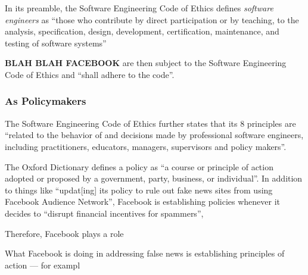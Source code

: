 \par In its preamble, the Software Engineering Code of Ethics defines \emph{software engineers} as ``those who contribute by direct participation or by teaching, to the analysis, specification, design, development, certification, maintenance, and testing of software systems'' 

\par \textbf{BLAH BLAH FACEBOOK} are then subject to the Software Engineering Code of Ethics and ``shall adhere to the code''. \cite{se_code}

\subsubsection{As Policymakers}

\par The Software Engineering Code of Ethics further states that its 8 principles are ``related to the behavior of and decisions made by professional software engineers, including practitioners, educators, managers, supervisors and policy makers''.
 
\par The Oxford Dictionary defines a policy as ``a course or principle of action adopted or proposed by a government, party, business, or individual''. \cite{oxford} In addition to things like ``updat[ing] its policy to rule out fake news sites from using Facebook Audience Network'', \cite{tc_ban} Facebook is establishing policies whenever it decides to ``disrupt financial incentives for spammers'', \cite{fb_hoaxes_2016}

\par Therefore, Facebook plays a role 

What Facebook is doing in addressing false news is establishing principles of action --- for exampl